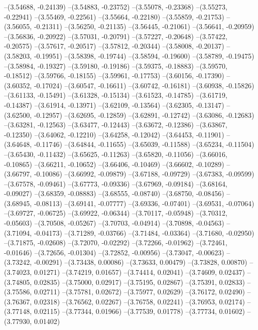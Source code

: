--(3.54688, -0.24139)
--(3.54883, -0.23752)
--(3.55078, -0.23368)
--(3.55273, -0.22941)
--(3.55469, -0.22561)
--(3.55664, -0.22180)
--(3.55859, -0.21753)
--(3.56055, -0.21311)
--(3.56250, -0.21135)
--(3.56445, -0.21061)
--(3.56641, -0.20959)
--(3.56836, -0.20922)
--(3.57031, -0.20791)
--(3.57227, -0.20648)
--(3.57422, -0.20575)
--(3.57617, -0.20517)
--(3.57812, -0.20344)
--(3.58008, -0.20137)
--(3.58203, -0.19951)
--(3.58398, -0.19744)
--(3.58594, -0.19600)
--(3.58789, -0.19475)
--(3.58984, -0.19327)
--(3.59180, -0.19186)
--(3.59375, -0.18883)
--(3.59570, -0.18512)
--(3.59766, -0.18155)
--(3.59961, -0.17753)
--(3.60156, -0.17390)
--(3.60352, -0.17024)
--(3.60547, -0.16611)
--(3.60742, -0.16181)
--(3.60938, -0.15826)
--(3.61133, -0.15491)
--(3.61328, -0.15134)
--(3.61523, -0.14785)
--(3.61719, -0.14387)
--(3.61914, -0.13971)
--(3.62109, -0.13564)
--(3.62305, -0.13147)
--(3.62500, -0.12957)
--(3.62695, -0.12859)
--(3.62891, -0.12742)
--(3.63086, -0.12683)
--(3.63281, -0.12563)
--(3.63477, -0.12443)
--(3.63672, -0.12386)
--(3.63867, -0.12350)
--(3.64062, -0.12210)
--(3.64258, -0.12042)
--(3.64453, -0.11901)
--(3.64648, -0.11746)
--(3.64844, -0.11655)
--(3.65039, -0.11588)
--(3.65234, -0.11504)
--(3.65430, -0.11432)
--(3.65625, -0.11263)
--(3.65820, -0.11056)
--(3.66016, -0.10865)
--(3.66211, -0.10652)
--(3.66406, -0.10469)
--(3.66602, -0.10289)
--(3.66797, -0.10086)
--(3.66992, -0.09879)
--(3.67188, -0.09729)
--(3.67383, -0.09599)
--(3.67578, -0.09461)
--(3.67773, -0.09336)
--(3.67969, -0.09184)
--(3.68164, -0.09027)
--(3.68359, -0.08883)
--(3.68555, -0.08740)
--(3.68750, -0.08456)
--(3.68945, -0.08113)
--(3.69141, -0.07777)
--(3.69336, -0.07401)
--(3.69531, -0.07064)
--(3.69727, -0.06725)
--(3.69922, -0.06344)
--(3.70117, -0.05948)
--(3.70312, -0.05603)
--(3.70508, -0.05267)
--(3.70703, -0.04914)
--(3.70898, -0.04563)
--(3.71094, -0.04173)
--(3.71289, -0.03766)
--(3.71484, -0.03364)
--(3.71680, -0.02950)
--(3.71875, -0.02608)
--(3.72070, -0.02292)
--(3.72266, -0.01962)
--(3.72461, -0.01646)
--(3.72656, -0.01304)
--(3.72852, -0.00956)
--(3.73047, -0.00623)
--(3.73242, -0.00291)
--(3.73438, 0.00086)
--(3.73633, 0.00479)
--(3.73828, 0.00870)
--(3.74023, 0.01271)
--(3.74219, 0.01657)
--(3.74414, 0.02041)
--(3.74609, 0.02437)
--(3.74805, 0.02835)
--(3.75000, 0.02917)
--(3.75195, 0.02867)
--(3.75391, 0.02833)
--(3.75586, 0.02711)
--(3.75781, 0.02672)
--(3.75977, 0.02629)
--(3.76172, 0.02490)
--(3.76367, 0.02318)
--(3.76562, 0.02267)
--(3.76758, 0.02241)
--(3.76953, 0.02174)
--(3.77148, 0.02115)
--(3.77344, 0.01966)
--(3.77539, 0.01778)
--(3.77734, 0.01602)
--(3.77930, 0.01402)
